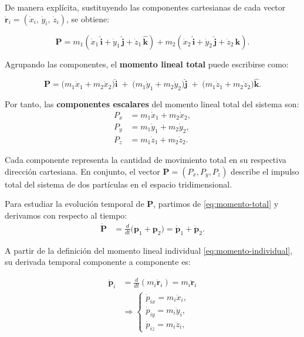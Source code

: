 \documentclass{article}
\begin{document}
De manera explícita, sustituyendo las componentes cartesianas de cada vector 
\(\dot{\boldsymbol{r}}_i = (\dot{x}_i,\, \dot{y}_i,\, \dot{z}_i)\), 
se obtiene:

\[
\boldsymbol{P} 
= m_1(\dot{x}_1\,\hat{\boldsymbol{i}} + \dot{y}_1\,\hat{\boldsymbol{j}} + \dot{z}_1\,\hat{\boldsymbol{k}}) 
 + m_2(\dot{x}_2\,\hat{\boldsymbol{i}} + \dot{y}_2\,\hat{\boldsymbol{j}} + \dot{z}_2\,\hat{\boldsymbol{k}}).
\]

Agrupando las componentes, el \textbf{momento lineal total} puede escribirse como:

\begin{equation}
\boldsymbol{P} = 
\big(m_1\dot{x}_1 + m_2\dot{x}_2\big)\hat{\boldsymbol{i}} \;+\;
\big(m_1\dot{y}_1 + m_2\dot{y}_2\big)\hat{\boldsymbol{j}} \;+\;
\big(m_1\dot{z}_1 + m_2\dot{z}_2\big)\hat{\boldsymbol{k}}.
\label{eq:momento-total-componentes}
\end{equation}

Por tanto, las \textbf{componentes escalares} del momento lineal total del sistema son:
\[
\boxed{
\begin{aligned}
P_x &= m_1\dot{x}_1 + m_2\dot{x}_2, \\[2pt]
P_y &= m_1\dot{y}_1 + m_2\dot{y}_2, \\[2pt]
P_z &= m_1\dot{z}_1 + m_2\dot{z}_2.
\end{aligned}
}
\]

Cada componente representa la cantidad de movimiento total en su respectiva dirección cartesiana.
En conjunto, el vector \(\boldsymbol{P} = (P_x, P_y, P_z)\) 
describe el impulso total del sistema de dos partículas en el espacio tridimensional.


Para estudiar la evolución temporal de $\boldsymbol{P}$, partimos de \eqref{eq:momento-total} y derivamos con respecto al tiempo:
\begin{equation}
\begin{split}
\dot{\boldsymbol{P}}
&= \frac{d}{dt}\Big(\boldsymbol{p}_1 + \boldsymbol{p}_2\Big)
 = \dot{\boldsymbol{p}}_1 + \dot{\boldsymbol{p}}_2.
\end{split}
\label{eq:derivada-p}
\end{equation}

A partir de la definición del momento lineal individual \eqref{eq:momento-individual},
su derivada temporal componente a componente es:

\begin{equation}
\begin{split}
\dot{\boldsymbol{p}}_i 
&= \frac{d}{dt}(m_i \dot{\boldsymbol{r}}_i) = m_i \ddot{\boldsymbol{r}}_i \\[4pt]
&\Rightarrow 
\begin{cases}
\dot{p}_{ix} = m_i \ddot{x}_i, \\[4pt]
\dot{p}_{iy} = m_i \ddot{y}_i, \\[4pt]
\dot{p}_{iz} = m_i \ddot{z}_i,
\end{cases}
\end{split}
\label{eq:derivada-pi-escalar}
\end{equation}
\end{document}
